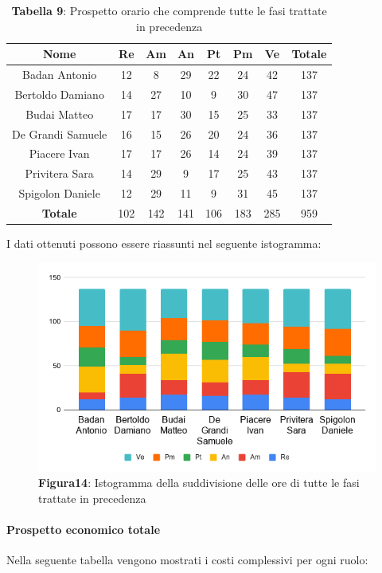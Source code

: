 \begin{table}[H]
	\centering
	\renewcommand{\arraystretch}{1.5}
	\begin{tabular}{|c|c|c|c|c|c|c|c|}
		\hline
		\rowcolor{lighter-grayer}
Nome & Re & Am & An & Pt & Pm & Ve & Totale \\ \hline
Badan Antonio & 12 & 8 & 29 & 22 & 24 & 42 & 137 \\ \hline
Bertoldo Damiano & 14 & 27 & 10 & 9 & 30 & 47 & 137 \\ \hline
Budai Matteo & 17 & 17 & 30 & 15 & 25 & 33 & 137 \\ \hline
De Grandi Samuele & 16 & 15 & 26 & 20 & 24 & 36 & 137 \\ \hline
Piacere Ivan & 17 & 17 & 26 & 14 & 24 & 39 & 137 \\ \hline
Privitera Sara & 14 & 29 & 9 & 17 & 25 & 43 & 137 \\ \hline
Spigolon Daniele & 12 & 29 & 11 & 9 & 31 & 45 & 137 \\ \hline
\textbf{Totale} & 102 & 142 & 141 & 106 & 183 & 285 & 959 \\ \hline
	\end{tabular}
	\caption*{\textbf{Tabella 9}: Prospetto orario che comprende tutte le fasi trattate in precedenza\\}
\end{table}	
I dati ottenuti possono essere riassunti nel seguente istogramma:

\begin{figure}[H]
	\centering
	\includegraphics[width=0.7\linewidth]{res/images/IstogrammaTotale.png}
	\caption*{\textbf{Figura14}: Istogramma della suddivisione delle ore di tutte le fasi trattate in precedenza}
	\label{fig:Figura10}
\end{figure}

\paragraph{Prospetto economico totale}
Nella seguente tabella vengono mostrati i costi complessivi per ogni ruolo:

